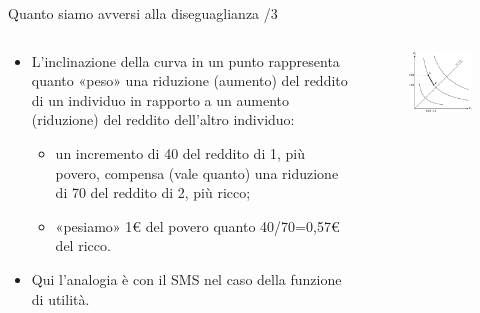 \documentclass[11pt]{beamer}
\begin{document}
\begin{frame}{Quanto siamo avversi alla diseguaglianza /3}
\begin{columns}
\begin{column}{.5\columnwidth}
\begin{itemize}
\item L'inclinazione della curva in un punto rappresenta quanto «peso» una
riduzione (aumento) del reddito di un individuo in rapporto a un aumento
(riduzione) del reddito dell'altro individuo:
\begin{itemize}
\item un incremento di 40 del reddito di 1, più povero, compensa (vale quanto)
una riduzione di 70 del reddito di 2, più ricco;
\item «pesiamo» 1€ del povero quanto 40/70=0,57€ del ricco.
\end{itemize}
\item Qui l'analogia è con il SMS nel caso della funzione di utilità.
\end{itemize}
\end{column}

\begin{column}{.5\columnwidth}
\begin{figure}[htbp]
\centering
\includegraphics[width=\textwidth]{./figure/fbs-2.pdf}
\end{figure}
\end{column}
\end{columns}
\end{frame}
\end{document}
